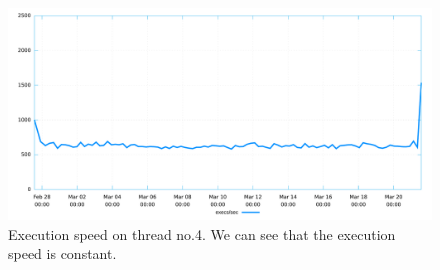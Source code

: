 \begin{figure}[H]
	\centering
	\includegraphics[width=0.8\linewidth]{obrazky-figures/thread_3/exec_speed.pdf}
	\caption{Execution speed on thread no.4. We can see that the execution speed
	is constant.}
	\label{fuz:result4a}
\end{figure}
%
%
%
%
%
%
%
%
%
%
%

